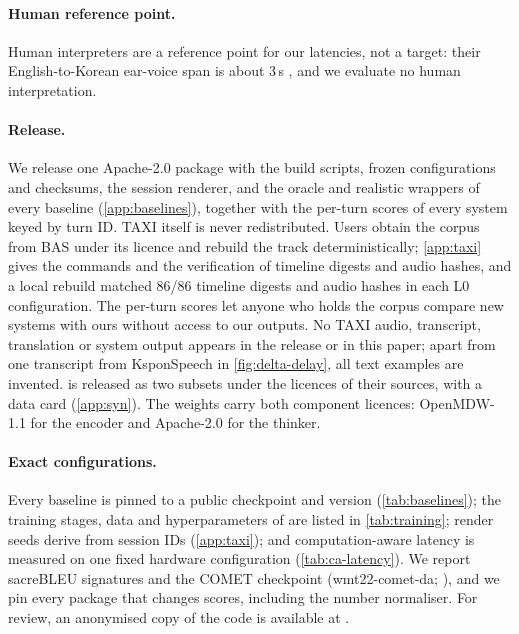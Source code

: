 \paragraph{Human reference point.}
Human interpreters are a reference point for our latencies, not a target: their English-to-Korean ear-voice span is about 3\,s \citep{lee2002ear}, and we evaluate no human interpretation.

\paragraph{Release.}
We release one Apache-2.0 package with the \taxi build scripts, frozen configurations and checksums, the session renderer, \scorer and the oracle and realistic wrappers of every baseline (\cref{app:baselines}), together with the per-turn scores of every system keyed by turn ID. TAXI itself is never redistributed. Users obtain the corpus from BAS under its licence \citep{bas2001taxi,reichel2016bas} and rebuild the track deterministically; \cref{app:taxi} gives the commands and the verification of timeline digests and audio hashes, and a local rebuild matched 86/86 timeline digests and audio hashes in each L0 configuration. The per-turn scores let anyone who holds the corpus compare new systems with ours without access to our outputs. No TAXI audio, transcript, translation or system output appears in the release or in this paper; apart from one transcript from KsponSpeech \citep{bang2020ksponspeech} in \cref{fig:delta-delay}, all text examples are invented. \syn is released as two subsets under the licences of their sources, with a data card (\cref{app:syn}). The \model weights carry both component licences: OpenMDW-1.1 for the encoder and Apache-2.0 for the thinker.

\paragraph{Exact configurations.}
Every baseline is pinned to a public checkpoint and version (\cref{tab:baselines}); the training stages, data and hyperparameters of \model are listed in \cref{tab:training}; render seeds derive from session IDs (\cref{app:taxi}); and computation-aware latency is measured on one fixed hardware configuration (\cref{tab:ca-latency}). We report sacreBLEU signatures \citep{post2018call} and the COMET checkpoint (wmt22-comet-da; \citealp{rei2022comet}), and we pin every package that changes scores, including the number normaliser. For review, an anonymised copy of the code is available at \tbdtext{}.

